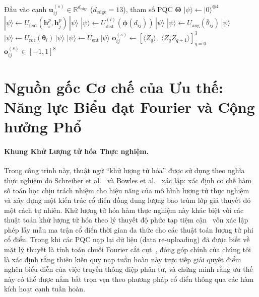 \documentclass[10pt,twocolumn,letterpaper]{article}
\begin{document}
\begin{algorithm}[t]
\caption{Toán tử Cạnh Q-PRISM (thay thế dòng~\ref{alg:prism_edge} của Thuật toán~\ref{alg:prism})}
\label{alg:qprism_edge}
\begin{algorithmic}[1]
\REQUIRE Đầu vào cạnh $\mathbf{u}_{ij}^{(s)} \in \mathbb{R}^{d_{\mathrm{edge}}}$ ($d_{\mathrm{edge}} = 13$), tham số PQC $\boldsymbol{\Theta}$
\STATE $|\psi\rangle \leftarrow |0\rangle^{\otimes 4}$
    \STATE $|\psi\rangle \leftarrow U_{\mathrm{feat}}(\mathbf{h}_i^p, \mathbf{h}_j^p)\,|\psi\rangle$ 
    \STATE $|\psi\rangle \leftarrow U_{\mathrm{dist}}^{(l)}(\boldsymbol{\phi}(d_{ij}))\,|\psi\rangle$ 
    \STATE $|\psi\rangle \leftarrow U_{\mathrm{ang}}(\bar{\theta}_{ij})\,|\psi\rangle$ 
    \STATE $|\psi\rangle \leftarrow U_{\mathrm{rot}}(\boldsymbol{\theta}_l)\,|\psi\rangle$ 
    \STATE $|\psi\rangle \leftarrow U_{\mathrm{ent}}\,|\psi\rangle$ 
\ENDFOR
\STATE $\mathbf{o}_{ij}^{(s)} \leftarrow [\langle Z_q \rangle,\; \langle Z_q Z_{q+1} \rangle]_{q=0}^3$ 
\RETURN $\mathbf{o}_{ij}^{(s)} \in [-1, 1]^8$
\end{algorithmic}
\end{algorithm}

\section{Nguồn gốc Cơ chế của Ưu thế: Năng lực Biểu đạt Fourier và Cộng hưởng Phổ}
\label{sm:mechanism_details}
\label{sm:spectral}
\label{sm:omega}
\label{sec:omega_sensitivity}
\label{sm:dequant_details}

\paragraph{Khung Khử Lượng tử hóa Thực nghiệm.}
Trong công trình này, thuật ngữ ``khử lượng tử hóa'' được sử dụng theo nghĩa thực nghiệm do Schreiber et al.~\cite{Schreiber:2022roq} và Bowles et al.~\cite{bowles2024better} xác lập: xác định cơ chế hàm số toán học chịu trách nhiệm cho hiệu năng của mô hình lượng tử thực nghiệm và xây dựng một kiến trúc cổ điển đồng dung lượng bao trùm lớp giả thuyết đó một cách tự nhiên. Khử lượng tử hóa hàm thực nghiệm này khác biệt với các thuật toán khử lượng tử hóa theo lý thuyết độ phức tạp tiệm cận~\cite{Tang:2018lmw} vốn xác lập phép lấy mẫu ma trận cổ điển thời gian đa thức cho các thuật toán lượng tử phi cổ điển.
Trong khi các PQC nạp lại dữ liệu (data re-uploading) đã được biết về mặt lý thuyết là tính toán chuỗi Fourier cắt cụt~\cite{Schuld:2020enb, landman2023approximating}, đóng góp chính của chúng tôi là xác định rằng thiên kiến quy nạp tuần hoàn này trực tiếp giải quyết điểm nghẽn biểu diễn của việc truyền thông điệp phân tử, và chứng minh rằng ưu thế này có thể được nắm bắt trọn vẹn theo phương pháp cổ điển thông qua các hàm kích hoạt cạnh tuần hoàn.
\end{document}
